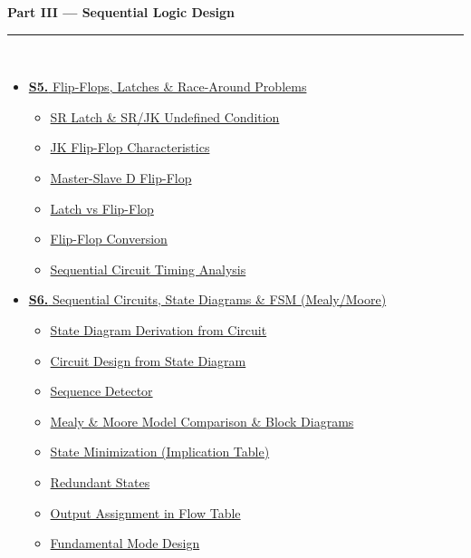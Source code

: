 \documentclass[12pt,a3paper]{article}
\begin{document}
\begin{tcolorbox}[breakable,colback=cE!5,colframe=cE,boxrule=1pt,arc=5pt,
  left=8pt,right=8pt,top=8pt,bottom=8pt,before skip=4pt]
  {\large\bfseries\textcolor{cE}{Part III --- Sequential Logic Design}}\\[5pt]
  \textcolor{cE!40}{\rule{\textwidth}{0.4pt}}\\[3pt]
  \small\begin{itemize}[leftmargin=1.2em,itemsep=1pt,label={\textcolor{cE}{$\triangleright$}}]
    \item \hyperref[sec:S5]{\textbf{S5.} Flip-Flops, Latches \& Race-Around Problems}
      \begin{itemize}[leftmargin=1.5em,itemsep=0pt,label={\textcolor{cE}{$\cdot$}}]
        \item \hyperref[sub:s5-sr]{SR Latch \& SR/JK Undefined Condition}
        \item \hyperref[sub:s5-jk]{JK Flip-Flop Characteristics}
        \item \hyperref[sub:s5-master-slave]{Master-Slave D Flip-Flop}
        \item \hyperref[sub:s5-latch-ff]{Latch vs Flip-Flop}
        \item \hyperref[sub:s5-conversion]{Flip-Flop Conversion}
        \item \hyperref[sub:s5-timing]{Sequential Circuit Timing Analysis}
      \end{itemize}
    \item \hyperref[sec:S6]{\textbf{S6.} Sequential Circuits, State Diagrams \& FSM (Mealy/Moore)}
      \begin{itemize}[leftmargin=1.5em,itemsep=0pt,label={\textcolor{cE}{$\cdot$}}]
        \item \hyperref[sub:s6-state-derivation]{State Diagram Derivation from Circuit}
        \item \hyperref[sub:s6-circuit-design]{Circuit Design from State Diagram}
        \item \hyperref[sub:s6-sequence]{Sequence Detector}
        \item \hyperref[sub:s6-mealy-moore]{Mealy \& Moore Model Comparison \& Block Diagrams}
        \item \hyperref[sub:s6-state-min]{State Minimization (Implication Table)}
        \item \hyperref[sub:s6-redundant]{Redundant States}
        \item \hyperref[sub:s6-output-assign]{Output Assignment in Flow Table}
        \item \hyperref[sub:s6-fundamental]{Fundamental Mode Design}

\end{itemize}
\end{itemize}
\end{tcolorbox}
\end{document}
